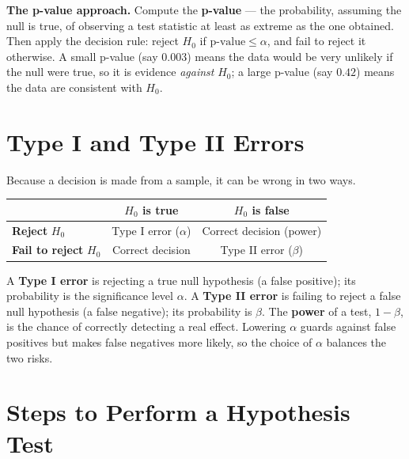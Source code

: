 \documentclass[
  11pt,
  letterpaper,
  DIV=11,
  numbers=noendperiod,
  oneside,
  open=any]{scrreprt}
\begin{document}
\textbf{The p-value approach.} Compute the \textbf{p-value} --- the
probability, assuming the null is true, of observing a test statistic at
least as extreme as the one obtained. Then apply the decision rule:
reject \(H_0\) if \(\text{p-value} \leq \alpha\), and fail to reject it
otherwise. A small p-value (say \(0.003\)) means the data would be very
unlikely if the null were true, so it is evidence \emph{against}
\(H_0\); a large p-value (say \(0.42\)) means the data are consistent
with \(H_0\).

\section{Type I and Type II Errors}\label{type-i-and-type-ii-errors}

Because a decision is made from a sample, it can be wrong in two ways.

\begin{center}
\begin{tabular}{lcc}
\toprule
 & \(H_0\) is true & \(H_0\) is false \\
\midrule
\textbf{Reject} \(H_0\) & Type I error (\(\alpha\)) & Correct decision (power) \\
\textbf{Fail to reject} \(H_0\) & Correct decision & Type II error (\(\beta\)) \\
\bottomrule
\end{tabular}
\end{center}

A \textbf{Type I error} is rejecting a true null hypothesis (a false
positive); its probability is the significance level \(\alpha\). A
\textbf{Type II error} is failing to reject a false null hypothesis (a
false negative); its probability is \(\beta\). The \textbf{power} of a
test, \(1 - \beta\), is the chance of correctly detecting a real effect.
Lowering \(\alpha\) guards against false positives but makes false
negatives more likely, so the choice of \(\alpha\) balances the two
risks.

\section{Steps to Perform a Hypothesis
Test}\label{steps-to-perform-a-hypothesis-test}
\end{document}
